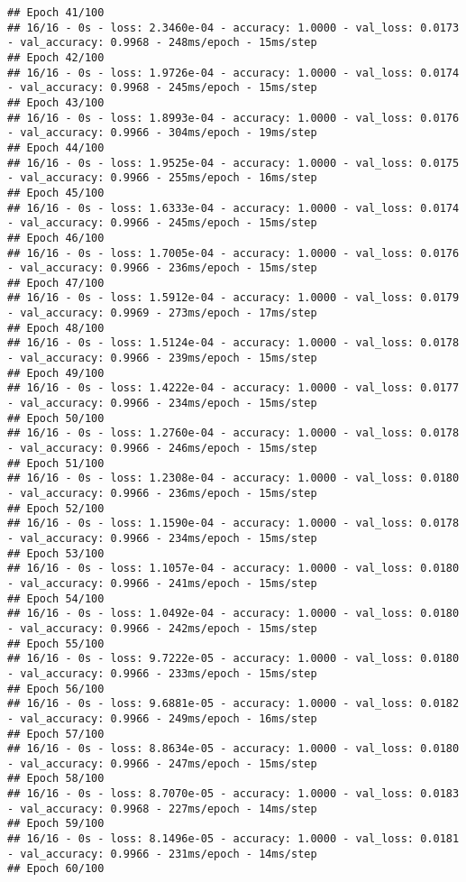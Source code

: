 \documentclass[
]{article}
\begin{document}
\begin{verbatim}
## Epoch 41/100
## 16/16 - 0s - loss: 2.3460e-04 - accuracy: 1.0000 - val_loss: 0.0173 - val_accuracy: 0.9968 - 248ms/epoch - 15ms/step
## Epoch 42/100
## 16/16 - 0s - loss: 1.9726e-04 - accuracy: 1.0000 - val_loss: 0.0174 - val_accuracy: 0.9968 - 245ms/epoch - 15ms/step
## Epoch 43/100
## 16/16 - 0s - loss: 1.8993e-04 - accuracy: 1.0000 - val_loss: 0.0176 - val_accuracy: 0.9966 - 304ms/epoch - 19ms/step
## Epoch 44/100
## 16/16 - 0s - loss: 1.9525e-04 - accuracy: 1.0000 - val_loss: 0.0175 - val_accuracy: 0.9966 - 255ms/epoch - 16ms/step
## Epoch 45/100
## 16/16 - 0s - loss: 1.6333e-04 - accuracy: 1.0000 - val_loss: 0.0174 - val_accuracy: 0.9966 - 245ms/epoch - 15ms/step
## Epoch 46/100
## 16/16 - 0s - loss: 1.7005e-04 - accuracy: 1.0000 - val_loss: 0.0176 - val_accuracy: 0.9966 - 236ms/epoch - 15ms/step
## Epoch 47/100
## 16/16 - 0s - loss: 1.5912e-04 - accuracy: 1.0000 - val_loss: 0.0179 - val_accuracy: 0.9969 - 273ms/epoch - 17ms/step
## Epoch 48/100
## 16/16 - 0s - loss: 1.5124e-04 - accuracy: 1.0000 - val_loss: 0.0178 - val_accuracy: 0.9966 - 239ms/epoch - 15ms/step
## Epoch 49/100
## 16/16 - 0s - loss: 1.4222e-04 - accuracy: 1.0000 - val_loss: 0.0177 - val_accuracy: 0.9966 - 234ms/epoch - 15ms/step
## Epoch 50/100
## 16/16 - 0s - loss: 1.2760e-04 - accuracy: 1.0000 - val_loss: 0.0178 - val_accuracy: 0.9966 - 246ms/epoch - 15ms/step
## Epoch 51/100
## 16/16 - 0s - loss: 1.2308e-04 - accuracy: 1.0000 - val_loss: 0.0180 - val_accuracy: 0.9966 - 236ms/epoch - 15ms/step
## Epoch 52/100
## 16/16 - 0s - loss: 1.1590e-04 - accuracy: 1.0000 - val_loss: 0.0178 - val_accuracy: 0.9966 - 234ms/epoch - 15ms/step
## Epoch 53/100
## 16/16 - 0s - loss: 1.1057e-04 - accuracy: 1.0000 - val_loss: 0.0180 - val_accuracy: 0.9966 - 241ms/epoch - 15ms/step
## Epoch 54/100
## 16/16 - 0s - loss: 1.0492e-04 - accuracy: 1.0000 - val_loss: 0.0180 - val_accuracy: 0.9966 - 242ms/epoch - 15ms/step
## Epoch 55/100
## 16/16 - 0s - loss: 9.7222e-05 - accuracy: 1.0000 - val_loss: 0.0180 - val_accuracy: 0.9966 - 233ms/epoch - 15ms/step
## Epoch 56/100
## 16/16 - 0s - loss: 9.6881e-05 - accuracy: 1.0000 - val_loss: 0.0182 - val_accuracy: 0.9966 - 249ms/epoch - 16ms/step
## Epoch 57/100
## 16/16 - 0s - loss: 8.8634e-05 - accuracy: 1.0000 - val_loss: 0.0180 - val_accuracy: 0.9966 - 247ms/epoch - 15ms/step
## Epoch 58/100
## 16/16 - 0s - loss: 8.7070e-05 - accuracy: 1.0000 - val_loss: 0.0183 - val_accuracy: 0.9968 - 227ms/epoch - 14ms/step
## Epoch 59/100
## 16/16 - 0s - loss: 8.1496e-05 - accuracy: 1.0000 - val_loss: 0.0181 - val_accuracy: 0.9966 - 231ms/epoch - 14ms/step
## Epoch 60/100

\end{verbatim}
\end{document}
